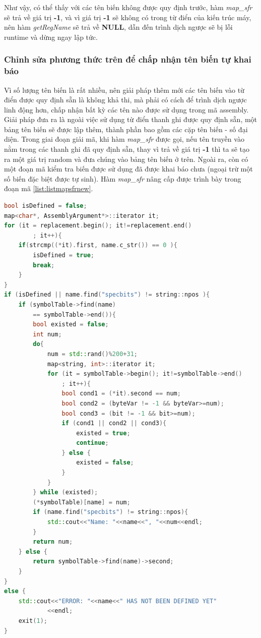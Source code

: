 Như vậy, có thể thấy với các tên biến không được quy định trước, hàm \textit{map\_sfr} sẽ trả về giá trị \textbf{-1}, và vì giá trị \textbf{-1} sẽ không có trong từ điển của kiến trúc máy, nên hàm \textit{getRegName} sẽ trả về \textbf{NULL}, dẫn đến trình dịch ngược sẽ bị lỗi runtime và dừng ngay lập tức.\\


\subsubsection{Chỉnh sửa phương thức trên để chấp nhận tên biến tự khai báo}
Vì số lượng tên biến là rất nhiều, nên giải pháp thêm mới các tên biến vào từ điển được quy định sẵn là không khả thi, mà phải có cách để trình dịch ngược linh động hơn, chấp nhận bất kỳ các tên nào được sử dụng trong mã assembly. Giải pháp đưa ra là ngoài việc sử dụng từ điển thanh ghi được quy định sẵn, một bảng tên biến sẽ được lập thêm, thành phần bao gồm các cặp tên biến - số đại diện. Trong giai đoạn giải mã, khi hàm \textit{map\_sfr} được gọi, nếu tên truyền vào nằm trong các thanh ghi đã quy định sẵn, thay vì trả về giá trị \textbf{-1} thì ta sẽ tạo ra một giá trị random và đưa chúng vào bảng tên biến ở trên. Ngoài ra, còn có một đoạn mã kiểm tra biến được sử dụng đã được khai báo chưa (ngoại trừ một số biến đặc biệt được tự sinh). Hàm \textit{map\_sfr} nâng cấp được trình bày trong đoạn mã \ref{list:listmapsfrnew}.\\
\begin{lstlisting}[caption={Phần mã mới được bổ sung trong hàm map\_sfr},label={list:listmapsfrnew},language=c++]
bool isDefined = false;
map<char*, AssemblyArgument*>::iterator it;
for (it = replacement.begin(); it!=replacement.end()
		; it++){
	if(strcmp((*it).first, name.c_str()) == 0 ){
		isDefined = true;
		break;
	}
}
if (isDefined || name.find("specbits") != string::npos ){
	if (symbolTable->find(name) 
		== symbolTable->end()){
		bool existed = false;
		int num;
		do{
			num = std::rand()%200+31;
			map<string, int>::iterator it;
			for (it = symbolTable->begin(); it!=symbolTable->end()
				; it++){
				bool cond1 = (*it).second == num;
				bool cond2 = (byteVar != -1 && byteVar>=num);
				bool cond3 = (bit != -1 && bit>=num);
				if (cond1 || cond2 || cond3){
					existed = true;
					continue;
				} else {
					existed = false;
				}	
			}
		} while (existed); 
		(*symbolTable)[name] = num;
		if (name.find("specbits") != string::npos){
			std::cout<<"Name: "<<name<<", "<<num<<endl;
		}	
		return num;
	} else {
		return symbolTable->find(name)->second;
	}
}
else {
	std::cout<<"ERROR: "<<name<<" HAS NOT BEEN DEFINED YET"
			<<endl;
	exit(1);
}
\end{lstlisting}
